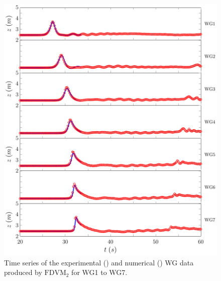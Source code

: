 \begin{figure}
	\centering
	\includegraphics[width=\textwidth]{./chp6/figures/Experiment/Roeber/Trial8/FDVM/LongWGs1.pdf}
	\caption{Time series of the experimental () and numerical ({\color{blue}\solidrule}) WG data produced by $\text{FDVM}_2$ for WG1 to WG7.}
	\label{fig:Roeber8WG1to5FDVM}
\end{figure}
